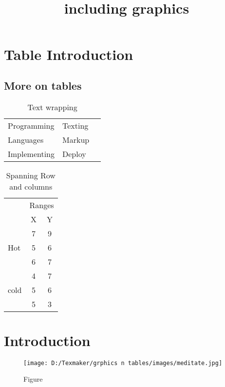 \documentclass{article}
\begin{document}
\title {including graphics}

\section {Table Introduction}
\subsection{More on tables}
\begin{table}[htbp]
\caption{Text wrapping}
\begin{center}
\begin{tabular}{| l | l | p{5 cm} |}
\hline
Programming & Texting\\
Languages &  Markup\\
Implementing & Deploy\\
\hline

\end{tabular}
\end{center}
\label{tab:wrapping}
\end{table}

\begin{table}[htbp]
\caption{Spanning Row and columns}
\begin{center}
\begin{tabular}{| l | c | c |}
\hline
& \multicolumn{2}{c|}{Ranges}\\
& X & Y\\
\hline
\multirow{3}{*}{Hot} & 7 & 9\\
&5 &6\\
&6 &7 \\
\multirow{3}{*}{cold} & 4 & 7\\
&5 &6\\
&5 &3 \\
\hline

\end{tabular}
\end{center}
\label{tab:multi}
\end{table}



\section{Introduction}
\begin{figure}
\centering
\texttt{[image: D:/Texmaker/grphics n tables/images/meditate.jpg]}
\caption{Figure}
\label{meditate}
\end{figure}
\end{document}
